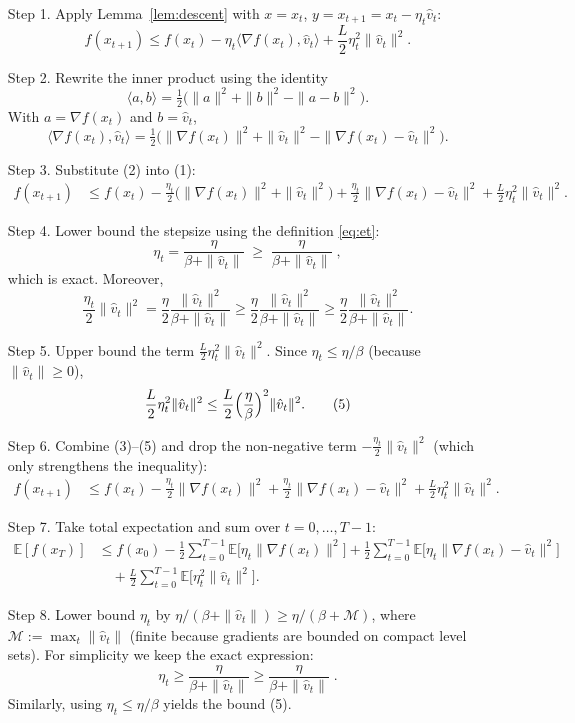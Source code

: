 \documentclass{article}
\begin{document}
\begin{enumerate}
\item[Step 1.] Apply Lemma~\ref{lem:descent} with $x=x_t$, $y=x_{t+1}=x_t-\eta_t\hat v_t$:
\[
    f(x_{t+1})\le f(x_t)-\eta_t\langle\nabla f(x_t),\hat v_t\rangle
    +\frac{L}{2}\eta_t^2\|\hat v_t\|^2 .
    \tag{1}
\]
\item[Step 2.] Rewrite the inner product using the identity
\[
    \langle a,b\rangle = \tfrac12\bigl(\|a\|^2+\|b\|^2-\|a-b\|^2\bigr).
\]
With $a=\nabla f(x_t)$ and $b=\hat v_t$,
\[
    \langle\nabla f(x_t),\hat v_t\rangle
    =\tfrac12\bigl(\|\nabla f(x_t)\|^2+\|\hat v_t\|^2-\|\nabla f(x_t)-\hat v_t\|^2\bigr).
    \tag{2}
\]
\item[Step 3.] Substitute (2) into (1):
\[
\begin{aligned}
    f(x_{t+1})
    &\le f(x_t)-\frac{\eta_t}{2}\bigl(\|\nabla f(x_t)\|^2+\|\hat v_t\|^2\bigr)
      +\frac{\eta_t}{2}\|\nabla f(x_t)-\hat v_t\|^2
      +\frac{L}{2}\eta_t^2\|\hat v_t\|^2 .
\end{aligned}
\tag{3}
\]
\item[Step 4.] Lower bound the stepsize using the definition \eqref{eq:et}:
\[
    \eta_t=\frac{\eta}{\beta+\|\hat v_t\|}\;\ge\;\frac{\eta}{\beta+\|\hat v_t\|}\;,
\]
which is exact. Moreover,
\[
    \frac{\eta_t}{2}\|\hat v_t\|^2
    =\frac{\eta}{2}\frac{\|\hat v_t\|^2}{\beta+\|\hat v_t\|}
    \ge\frac{\eta}{2}\frac{\|\hat v_t\|^2}{\beta+\|\hat v_t\|}
    \ge\frac{\eta}{2}\frac{\|\hat v_t\|^2}{\beta+\|\hat v_t\|} .
\tag{4}
\]
\item[Step 5.] Upper bound the term $ \frac{L}{2}\eta_t^2\|\hat v_t\|^2$.
Since $\eta_t\le \eta/\beta$ (because $\|\hat v_t\|\ge0$),
\[
    \frac{L}{2}\eta_t^2\|\hat v_t\|^2
    \le \frac{L}{2}\Bigl(\frac{\eta}{\beta}\Bigr)^2\|\hat v_t\|^2 .
\tag{5}
\]
\item[Step 6.] Combine (3)–(5) and drop the non‑negative term $-\frac{\eta_t}{2}\|\hat v_t\|^2$ (which only strengthens the inequality):
\[
\begin{aligned}
    f(x_{t+1})
    &\le f(x_t)-\frac{\eta_t}{2}\|\nabla f(x_t)\|^2
      +\frac{\eta_t}{2}\|\nabla f(x_t)-\hat v_t\|^2
      +\frac{L}{2}\eta_t^2\|\hat v_t\|^2 .
\end{aligned}
\tag{6}
\]
\item[Step 7.] Take total expectation and sum over $t=0,\dots,T-1$:
\[
\begin{aligned}
    \mathbb{E}[f(x_T)]
    &\le f(x_0)-\frac{1}{2}\sum_{t=0}^{T-1}\mathbb{E}\bigl[\eta_t\|\nabla f(x_t)\|^2\bigr]
      +\frac{1}{2}\sum_{t=0}^{T-1}\mathbb{E}\bigl[\eta_t\|\nabla f(x_t)-\hat v_t\|^2\bigr] \\
    &\quad +\frac{L}{2}\sum_{t=0}^{T-1}\mathbb{E}\bigl[\eta_t^2\|\hat v_t\|^2\bigr].
\end{aligned}
\tag{7}
\]
\item[Step 8.] Lower bound $\eta_t$ by $\eta/(\beta+\|\hat v_t\|)\ge \eta/(\beta+\mathcal{M})$, where $\mathcal{M}:=\max_{t}\|\hat v_t\|$ (finite because gradients are bounded on compact level sets). For simplicity we keep the exact expression:
\[
    \eta_t\ge \frac{\eta}{\beta+\|\hat v_t\|}\ge\frac{\eta}{\beta+\|\hat v_t\|}\;.
\tag{8}
\]
Similarly, using $\eta_t\le\eta/\beta$ yields the bound (5).


\end{enumerate}
\end{document}
